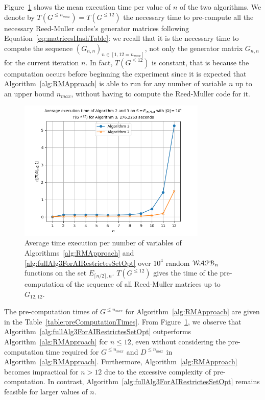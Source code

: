 \documentclass[11pt]{llncs}
\begin{document}
Figure~\ref{fig:compTimePlot} shows the mean execution time per value of $n$ of the two algorithms.
We denote by $T\left(G^{\leq n_{max}}\right) = T\left(G^{\leq 12} \right)$ the necessary time to pre-compute all the necessary Reed-Muller codes's generator matrices following Equation~\eqref{eq:matricesHashTable}: we recall that it is the necessary time to compute the sequence $\left(G_{n,n}\right)_{n\in [1,12=n_{max}]}$, not only the generator matrix $G_{n,n}$ for the current iteration $n$. 
In fact, $T\left(G^{\leq 12}\right)$ is constant, that is because the computation occurs before beginning the experiment since it is expected that Algorithm~\ref{alg:RMApproach} is able to run for any number of variable $n$ up to an upper bound $n_{max}$, without having to compute the Reed-Muller code for it. 

\begin{figure}
    \centering
    \includegraphics[width=0.8\textwidth]{images/plot_n_12_sample_10000.png}
    \caption{Average time execution per number of variables of Algorithms~\ref{alg:RMApproach} and \ref{alg:fullAlg3ForAIRestrictesSetOpt} over $10^4$ random $\mathcal{WAPB}_{n}$ functions on the set $E_{\lceil{n/2}\rceil,n}$. 
    $T\left(G^{\leq 12}\right)$ gives the time of the pre-computation of the sequence of all Reed-Muller matrices up to $G_{12,12}$.}\label{fig:compTimePlot}
\end{figure}

The pre-computation times of $G^{\leq n_{max}}$ for Algorithm~\ref{alg:RMApproach} are given in the Table~\ref{table:preComputationTimes}. From Figure~\ref{fig:compTimePlot}, we observe that Algorithm~\ref{alg:fullAlg3ForAIRestrictesSetOpt} outperforms Algorithm~\ref{alg:RMApproach} for $n \leq 12$, even without considering the pre-computation time required for $G^{\leq n_{max}}$ and $D^{\leq n_{max}}$ in Algorithm~\ref{alg:RMApproach}. Furthermore, Algorithm~\ref{alg:RMApproach} becomes impractical for $n > 12$ due to the excessive complexity of pre-computation. In contrast, Algorithm~\ref{alg:fullAlg3ForAIRestrictesSetOpt} remains feasible for larger values of $n$. 
\end{document}
